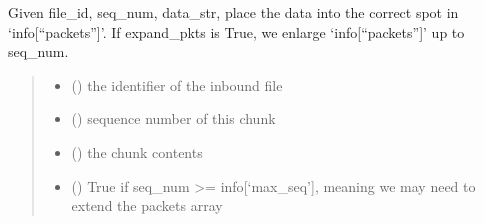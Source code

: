 \documentclass[letterpaper,10pt,oneside,english,openany]{sphinxmanual}
\begin{document}
\begin{fulllineitems}
\begin{fulllineitems}
\label{\detokenize{modules:receiver_rdt.Receiver.add_packet}}
\pysigstartsignatures
\pysiglinewithargsret
{}
{\sphinxparamcomma {}\sphinxparamcomma {}\sphinxparamcomma {}}
{}
\pysigstopsignatures
\sphinxAtStartPar
Given file\_id, seq\_num, data\_str, place the data into the correct spot
in ‘info{[}“packets”{]}’. If expand\_pkts is True, we enlarge ‘info{[}“packets”{]}’
up to seq\_num.
\begin{quote}\begin{description}
\begin{itemize}
\item {} 
\sphinxAtStartPar
{} () \textendash{} the identifier of the inbound file

\item {} 
\sphinxAtStartPar
{} () \textendash{} sequence number of this chunk

\item {} 
\sphinxAtStartPar
{} () \textendash{} the chunk contents

\item {} 
\sphinxAtStartPar
{} () \textendash{} True if seq\_num \textgreater{}= info{[}‘max\_seq’{]}, meaning we may need
to extend the packets array

\end{itemize}

\end{description}\end{quote}

\end{fulllineitems}


\begin{fulllineitems}
\label{\detokenize{modules:id0}}
\pysigstartsignatures
\pysigline
{}
\pysigstopsignatures
\end{fulllineitems}


\end{fulllineitems}
\end{document}
